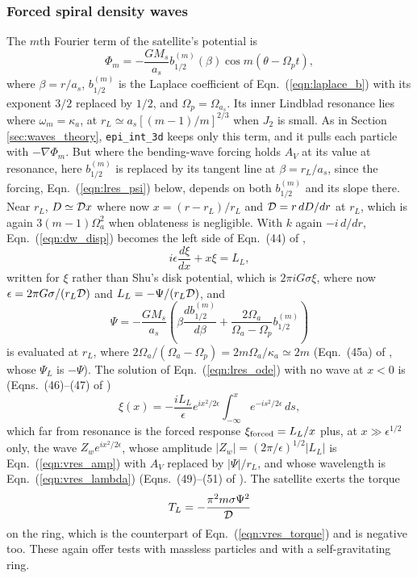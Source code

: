 \documentclass[twocolumn]{aastex702}
\newcommand{\code}[1]{\texttt{#1}}   %
\begin{document}
\subsubsection{Forced spiral density waves}
\label{sec:density_theory}

The $m$th Fourier term of the satellite's potential is
\begin{equation}
    \label{eqn:lres_phi}
    \Phi_m = -\frac{GM_s}{a_s}b_{1/2}^{(m)}(\beta)\cos m(\theta - \Omega_pt),
\end{equation}
where $\beta = r/a_s$, $b_{1/2}^{(m)}$ is the Laplace coefficient of Eqn.\ (\ref{eqn:laplace_b}) with its exponent
$3/2$ replaced by $1/2$, and $\Omega_p = \Omega_{a_s}$. Its inner
Lindblad resonance lies where $\omega_m = \kappa_a$, at $r_L \simeq a_s[(m - 1)/m]^{2/3}$ when $J_2$ is small.
As in Section \ref{sec:waves_theory}, \code{epi\_int\_3d} keeps only this term, and it pulls each particle with
$-\nabla\Phi_m$. But where the bending-wave forcing holds $A_V$ at its value at resonance, here $b_{1/2}^{(m)}$ is
replaced by its tangent line at $\beta = r_L/a_s$, since the forcing, Eqn.\ (\ref{eqn:lres_psi}) below, depends on
both $b_{1/2}^{(m)}$ and its slope there. Near $r_L$, $D \simeq {\cal D}x$
where now $x = (r - r_L)/r_L$ and ${\cal D} = r\,dD/dr$ at $r_L$, which is again $3(m - 1)\Omega_a^2$ when oblateness
is negligible. With $k$ again $-i\,d/dr$, Eqn.\ (\ref{eqn:dw_disp}) becomes the left side of Eqn.\ (44) of \cite{S84},
\begin{equation}
    \label{eqn:lres_ode}
    i\epsilon\frac{d\xi}{dx} + x\xi = L_L,
\end{equation}
written for $\xi$ rather than Shu's disk potential, which is $2\pi iG\sigma\xi$, where now
$\epsilon = 2\pi G\sigma/(r_L{\cal D})$ and $L_L = -\Psi/(r_L{\cal D})$, and
\begin{equation}
    \label{eqn:lres_psi}
    \Psi = -\frac{GM_s}{a_s}\left(\beta\frac{db_{1/2}^{(m)}}{d\beta} + \frac{2\Omega_a}{\Omega_a - \Omega_p}b_{1/2}^{(m)}\right)
\end{equation}
is evaluated at $r_L$, where $2\Omega_a/(\Omega_a - \Omega_p) = 2m\Omega_a/\kappa_a \simeq 2m$ (Eqn.\ (45a) of
\citealt{S84}, whose $\Psi_L$ is $-\Psi$). The solution of Eqn.\ (\ref{eqn:lres_ode}) with no wave at $x < 0$ is
(Eqns.\ (46)--(47) of \citealt{S84})
\begin{equation}
    \label{eqn:lres_xi}
    \xi(x) = -\frac{iL_L}{\epsilon}e^{ix^2/2\epsilon}\int_{-\infty}^xe^{-is^2/2\epsilon}\,ds,
\end{equation}
which far from resonance is the forced response $\xi_{\rm forced} = L_L/x$ plus, at $x \gg \epsilon^{1/2}$ only, the
wave $Z_we^{ix^2/2\epsilon}$, whose amplitude $|Z_w| = (2\pi/\epsilon)^{1/2}|L_L|$ is Eqn.\ (\ref{eqn:vres_amp}) with
$A_V$ replaced by $|\Psi|/r_L$, and whose wavelength is Eqn.\ (\ref{eqn:vres_lambda}) (Eqns.\ (49)--(51) of
\citealt{S84}). The satellite exerts the torque \citep{GT79b}
\begin{equation}
    \label{eqn:lres_torque}
    T_L = -\frac{\pi^2m\sigma\Psi^2}{\cal D}
\end{equation}
on the ring, which is the counterpart of Eqn.\ (\ref{eqn:vres_torque}) and is negative too. These again offer tests with massless
particles and with a self-gravitating ring.
\end{document}
